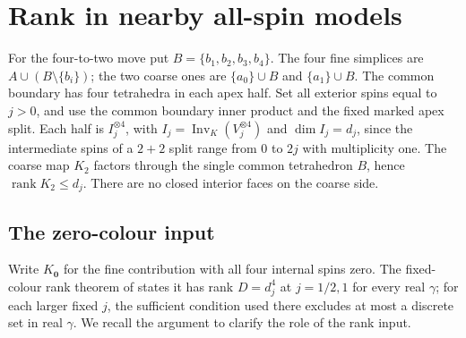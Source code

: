\documentclass[11pt]{article}
\theoremstyle{remark}
\DeclareMathOperator{\Inv}{Inv}
\DeclareMathOperator{\rank}{rank}
\begin{document}
\section{Rank in nearby all-spin models}
For the four-to-two move put \(B=\{b_1,b_2,b_3,b_4\}\). The four fine simplices are \(A\cup(B\setminus\{b_i\})\); the two coarse ones are \(\{a_0\}\cup B\) and \(\{a_1\}\cup B\). The common boundary has four tetrahedra in each apex half. Set all exterior spins equal to \(j>0\), and use the common boundary inner product and the fixed marked apex split. Each half is \(I_j^{\otimes4}\), with \(I_j=\Inv_K(V_j^{\otimes4})\) and \(\dim I_j=d_j\), since the intermediate spins of a \(2+2\) split range from \(0\) to \(2j\) with multiplicity one. The coarse map \(K_2\) factors through the single common tetrahedron \(B\), hence \(\rank K_2\le d_j\). There are no closed interior faces on the coarse side.

\subsection{The zero-colour input}
Write \(K_{\boldsymbol 0}\) for the fine contribution with all four internal spins zero. The fixed-colour rank theorem of \cite{Archive69} states it has rank \(D=d_j^4\) at \(j=1/2,1\) for every real \(\gamma\); for each larger fixed \(j\), the sufficient condition used there excludes at most a discrete set in real \(\gamma\). We recall the argument to clarify the role of the rank input.
\end{document}
